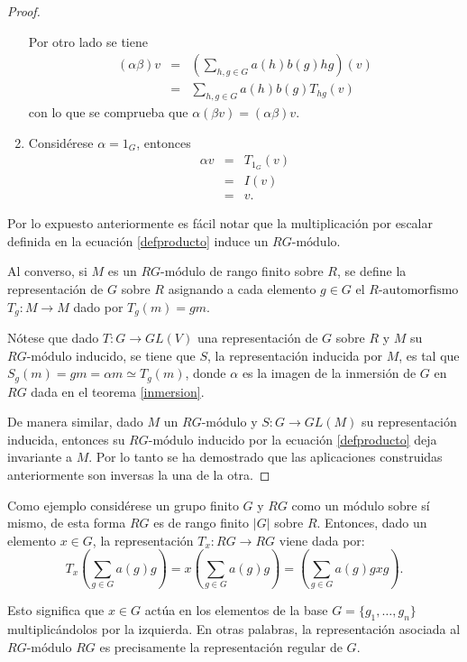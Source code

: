 \begin{proof}
\begin{enumerate}
 Por otro lado se tiene
 \begin{eqnarray*}
 (\alpha\beta)v &=& \left( \sum_{h,g \in G}a(h)b(g)hg  \right)(v)\\
  &=& \sum_{h,g \in G}a(h)b(g)T_{hg}(v)
 \end{eqnarray*}
 con lo que se comprueba que $\alpha(\beta v) = (\alpha\beta)v$.
 \item Considérese $\alpha = 1_{G}$, entonces
 \begin{eqnarray*}
 \alpha v &=& T_{1_G}(v)\\
  &=& I(v) \\
  &=& v.
 \end{eqnarray*}
 \end{enumerate}
 
 Por lo expuesto anteriormente es fácil notar que la multiplicación por escalar definida en la ecuación \ref{defproducto} induce un $RG\mbox{-módulo}$.
 
 Al converso, si $M$ es un $RG\mbox{-módulo}$ de rango finito sobre $R$, se define la representación de $G$ sobre $R$ asignando a cada elemento $g \in G$ el $R\mbox{-automorfismo}$ $T_g \colon M \to M$ dado por $T_g(m) = gm$.
 
 Nótese que dado $T \colon G \to GL(V)$ una representación de $G$ sobre $R$ y $M$ su $RG\mbox{-módulo}$ inducido, se tiene que $S$, la representación inducida por $M$, es tal que $S_g(m) = gm = \alpha m \simeq T_g(m)$, donde $\alpha$ es la imagen de la inmersión de $G$ en $RG$ dada en el teorema \ref{inmersion}.
 
 De manera similar, dado $M$ un $RG\mbox{-módulo}$ y $S \colon G \to GL(M)$ su representación inducida, entonces su $RG\mbox{-módulo}$ inducido por la ecuación \ref{defproducto} deja invariante a $M$. Por lo tanto se ha demostrado que las aplicaciones construidas anteriormente son inversas la una de la otra. 
 \end{proof}
  Como ejemplo considérese  un grupo finito $G$ y $RG$ como un módulo sobre sí mismo, de esta forma $RG$ es de rango finito $|G|$ sobre $R$. Entonces, dado un elemento $x \in G$, la representación $T_x \colon RG \to RG$ viene dada por: \begin{equation*}T_{x}\left( \sum_{g \in G}a(g)g\right) = x\left( \sum_{g \in G}a(g)g\right) = \left( \sum_{g \in G}a(g)gxg\right).\end{equation*}
  
  Esto significa que $x \in G$ actúa en los elementos de la base $G = \{ g_1, \dots, g_n \}$ multiplicándolos por la izquierda. En otras palabras, la representación asociada al $RG\mbox{-módulo}$ $RG$ es precisamente la representación regular de $G$. \newline
   
